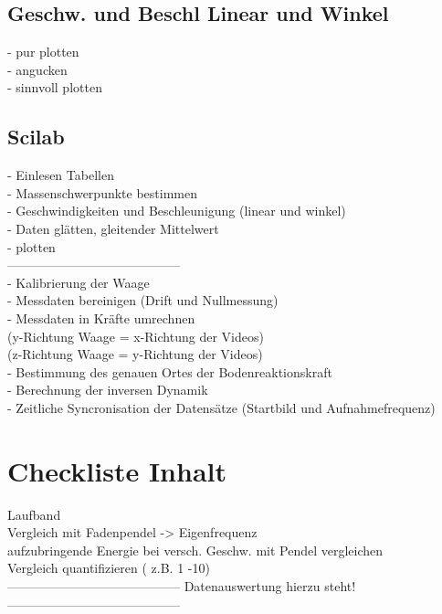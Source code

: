 \subsection{Geschw. und Beschl Linear und Winkel}
- pur plotten\\
- angucken\\
- sinnvoll plotten\\
\subsection{Scilab}
- Einlesen Tabellen\\
- Massenschwerpunkte bestimmen\\
- Geschwindigkeiten und Beschleunigung (linear und winkel)\\
- Daten glätten, gleitender Mittelwert\\
- plotten\\
-----------------------------------------\\
- Kalibrierung der Waage\\
- Messdaten bereinigen (Drift und Nullmessung)\\
- Messdaten in Kräfte umrechnen\\
(y-Richtung Waage = x-Richtung der Videos)\\
(z-Richtung Waage = y-Richtung der Videos)\\
- Bestimmung des genauen Ortes der Bodenreaktionskraft\\
- Berechnung der inversen Dynamik\\
- Zeitliche Syncronisation der Datensätze (Startbild und Aufnahmefrequenz)\\
\clearpage

\section{Checkliste Inhalt}
Laufband\\
Vergleich mit Fadenpendel -> Eigenfrequenz\\
aufzubringende Energie bei versch. Geschw. mit Pendel vergleichen\\
Vergleich quantifizieren ( z.B. 1 -10)\\
-----------------------------------------
Datenauswertung hierzu steht!
-----------------------------------------\\\\


